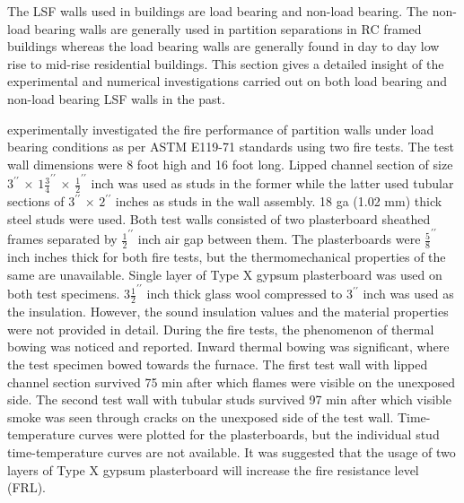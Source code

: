 The LSF walls used in buildings are load bearing and non-load bearing. The non-load bearing walls are generally used in partition separations in RC framed buildings whereas the load bearing walls are generally found in day to day low rise to mid-rise residential buildings. This section gives a detailed insight of the experimental and numerical investigations carried out on both load bearing and non-load bearing LSF walls in the past.

\citet{Son} experimentally investigated the fire performance of partition walls under load bearing conditions as per ASTM E119-71 standards using two fire tests. The test wall dimensions were 8 foot high and 16 foot long. Lipped channel section of size $3^{\prime\prime}$ $\times$ $1\tfrac{3}{4}^{\prime\prime}$ $\times$ $\tfrac{1}{2}^{\prime\prime}$ inch was used as studs in the former while the latter used tubular sections of $3^{\prime\prime}$ $\times$ $2^{\prime\prime}$ inches as studs in the wall assembly. 18 ga (1.02 mm) thick steel studs were used. Both test walls consisted of two plasterboard sheathed frames separated by $\tfrac{1}{2}^{\prime\prime}$ inch air gap between them. The plasterboards were $\tfrac{5}{8}^{\prime\prime}$ inch inches thick for both fire tests, but the thermomechanical properties of the same are unavailable. Single layer of Type X gypsum plasterboard was used on both test specimens. $3\tfrac{1}{2}^{\prime\prime}$ inch thick glass wool compressed to $3^{\prime\prime}$ inch was used as the insulation. However, the sound insulation values and the material properties were not provided in detail. During the fire tests, the phenomenon of thermal bowing was noticed and reported. Inward thermal bowing was significant, where the test specimen bowed towards the furnace. The first test wall with lipped channel section survived 75 min after which flames were visible on the unexposed side. The second test wall with tubular studs survived 97 min after which visible smoke was seen through cracks on the unexposed side of the test wall. Time-temperature curves were plotted for the plasterboards, but the individual stud time-temperature curves are not available. It was suggested that the usage of two layers of Type X gypsum plasterboard will increase the fire resistance level (FRL).   

